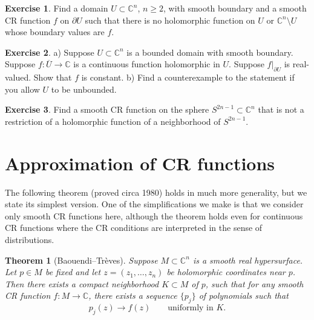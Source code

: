 \documentclass[12pt,openany]{book}
\newcommand{\C}{{\mathbb{C}}}
\theoremstyle{plain}
\newtheorem{thm}{Theorem}[section]
\theoremstyle{remark}
\theoremstyle{definition}
\newenvironment{exbox}{%
    \def\FrameCommand{\vrule width 1pt \relax\hspace {10pt}}%
    \MakeFramed {\advance \hsize -\width \FrameRestore }%
}{%
    \endMakeFramed
}
\theoremstyle{exercise}
\newtheorem{exercise}{Exercise}[section]
\theoremstyle{example}
\begin{document}
\begin{exbox}
\begin{exercise}
Find a domain $U \subset \C^n$, $n \geq 2$, with smooth boundary and a smooth
CR function $f$ on $\partial U$ such that there is no holomorphic function
on $U$ or $\C^n \setminus U$ whose boundary values are $f$.
\end{exercise}

\begin{exercise}
a) Suppose $U \subset \C^n$ is a bounded domain with smooth boundary.  Suppose
$f \colon \overline{U} \to \C$ is a continuous function holomorphic in
$U$.  Suppose $f|_{\partial U}$ is real-valued.  Show that $f$ is
constant. b) Find a counterexample to the statement if you allow $U$
to be unbounded.
\end{exercise}

\begin{exercise}
Find a smooth CR function on the sphere $S^{2n-1} \subset \C^n$ that is not
a restriction of a holomorphic function of a neighborhood of $S^{2n-1}$.
\end{exercise}
\end{exbox}



\section{Approximation of CR functions}

The following theorem (proved circa 1980) holds in much more generality, but
we state its simplest version.  One of the simplifications we make is that
we consider only smooth CR functions here, although the theorem holds even
for continuous CR functions where the CR conditions are interpreted in the
sense of distributions.

\begin{thm}[Baouendi--Tr{\`e}ves]%
Suppose $M \subset \C^n$ is a smooth real hypersurface.
Let $p \in M$ be fixed and let $z=(z_1,\ldots,z_n)$ be holomorphic
coordinates near $p$.
Then there exists a compact
neighborhood $K \subset M$ of $p$, such that for any smooth CR function $f \colon M \to \C$,
there exists a sequence $\{ p_j \}$ of polynomials such that
\begin{equation*}
p_j(z) \to f(z)
\qquad \text{uniformly in $K$.}
\end{equation*}
\end{thm}
\end{document}
